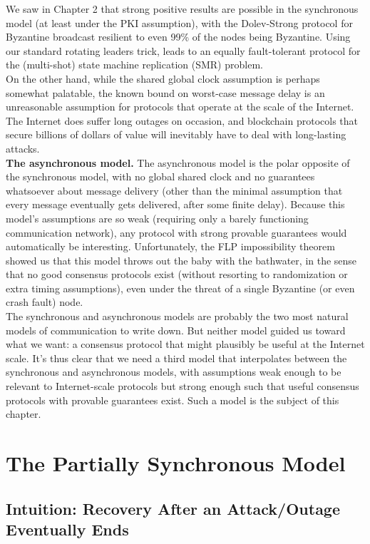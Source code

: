 We saw in Chapter 2 that strong positive results are possible in the synchronous model (at
least under the PKI assumption), with the Dolev-Strong protocol for Byzantine broadcast
resilient to even 99\% of the nodes being Byzantine. Using our standard rotating leaders trick,
leads to an equally fault-tolerant protocol for the (multi-shot) state machine replication
(SMR) problem.\\
On the other hand, while the shared global clock assumption is perhaps somewhat palatable, the known bound on worst-case message delay is an unreasonable assumption for protocols that operate at the scale of the Internet. The Internet does suffer long outages
on occasion, and blockchain protocols that secure billions of dollars of value will inevitably
have to deal with long-lasting attacks.\\

\noindent
\textbf{The asynchronous model.} The asynchronous model is the polar opposite of the synchronous
model, with no global shared clock and no guarantees whatsoever about message delivery
(other than the minimal assumption that every message eventually gets delivered, after
some finite delay). Because this model’s assumptions are so weak (requiring only a barely
functioning communication network), any protocol with strong provable guarantees would
automatically be interesting. Unfortunately, the FLP impossibility theorem showed us that
this model throws out the baby with the bathwater, in the sense that no good consensus
protocols exist (without resorting to randomization or extra timing assumptions), even under
the threat of a single Byzantine (or even crash fault) node.\\
The synchronous and asynchronous models are probably the two most natural models of
communication to write down. But neither model guided us toward what we want: a
consensus protocol that might plausibly be useful at the Internet scale. It’s thus clear that
we need a third model that interpolates between the synchronous and asynchronous
models, with assumptions weak enough to be relevant to Internet-scale protocols but strong
enough such that useful consensus protocols with provable guarantees exist. Such a model
is the subject of this chapter.

\section{The Partially Synchronous Model}
\subsection{Intuition: Recovery After an Attack/Outage Eventually Ends}

